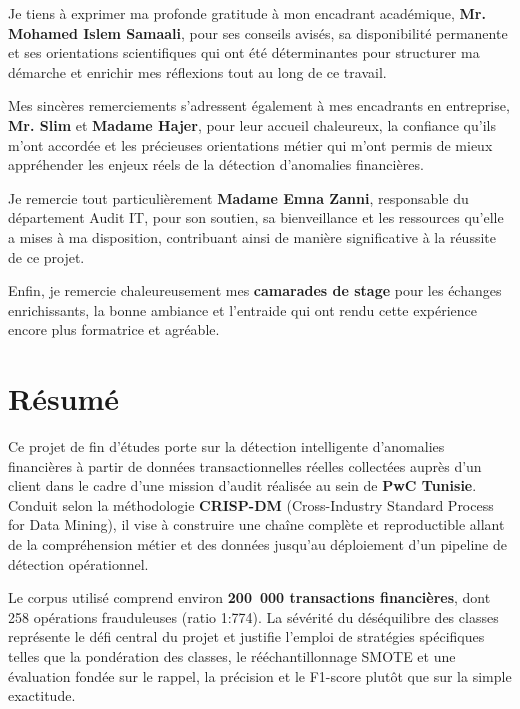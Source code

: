 \documentclass[12pt,a4paper,twoside]{report}
\begin{document}
\medskip

Je tiens à exprimer ma profonde gratitude à mon encadrant académique, \textbf{Mr. Mohamed Islem Samaali}, pour ses conseils avisés, sa disponibilité permanente et ses orientations scientifiques qui ont été déterminantes pour structurer ma démarche et enrichir mes réflexions tout au long de ce travail.

\medskip

Mes sincères remerciements s'adressent également à mes encadrants en entreprise, \textbf{Mr. Slim} et \textbf{Madame Hajer}, pour leur accueil chaleureux, la confiance qu'ils m'ont accordée et les précieuses orientations métier qui m'ont permis de mieux appréhender les enjeux réels de la détection d'anomalies financières.

\medskip

Je remercie tout particulièrement \textbf{Madame Emna Zanni}, responsable du département Audit IT, pour son soutien, sa bienveillance et les ressources qu'elle a mises à ma disposition, contribuant ainsi de manière significative à la réussite de ce projet.

\medskip

Enfin, je remercie chaleureusement mes \textbf{camarades de stage} pour les échanges enrichissants, la bonne ambiance et l'entraide qui ont rendu cette expérience encore plus formatrice et agréable.

\newpage

\chapter*{Résumé}

Ce projet de fin d'études porte sur la détection intelligente d'anomalies financières à partir de données transactionnelles réelles collectées auprès d'un client dans le cadre d'une mission d'audit réalisée au sein de \textbf{PwC Tunisie}. Conduit selon la méthodologie \textbf{CRISP-DM} (Cross-Industry Standard Process for Data Mining), il vise à construire une chaîne complète et reproductible allant de la compréhension métier et des données jusqu'au déploiement d'un pipeline de détection opérationnel.

Le corpus utilisé comprend environ \textbf{200~000 transactions financières}, dont 258 opérations frauduleuses (ratio 1:774). La sévérité du déséquilibre des classes représente le défi central du projet et justifie l'emploi de stratégies spécifiques telles que la pondération des classes, le rééchantillonnage SMOTE et une évaluation fondée sur le rappel, la précision et le F1-score plutôt que sur la simple exactitude.
\end{document}
